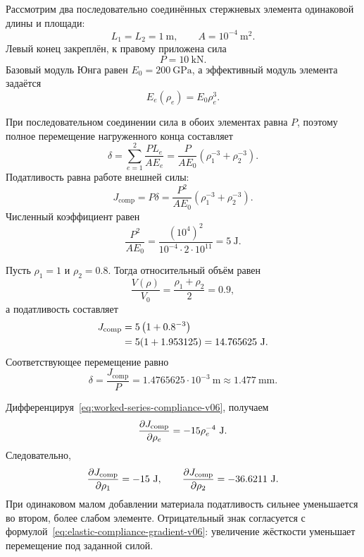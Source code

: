 Рассмотрим два последовательно соединённых стержневых элемента одинаковой длины и площади:
\[
 L_1=L_2=1\ \mathrm{m},
 \qquad
 A=10^{-4}\ \mathrm{m}^2.
\]
Левый конец закреплён, к правому приложена сила
\[
 P=10\ \mathrm{kN}.
\]
Базовый модуль Юнга равен $E_0=200\ \mathrm{GPa}$, а эффективный модуль элемента задаётся
\begin{equation}
\label{eq:worked-density-modulus-v06}
 E_e(\rho_e)=E_0\rho_e^3.
\end{equation}

При последовательном соединении сила в обоих элементах равна $P$, поэтому полное перемещение нагруженного конца составляет
\begin{equation}
\label{eq:worked-series-displacement-v06}
 \delta
 =\sum_{e=1}^2\frac{PL_e}{AE_e}
 =\frac{P}{AE_0}
 \left(\rho_1^{-3}+\rho_2^{-3}\right).
\end{equation}
Податливость равна работе внешней силы:
\begin{equation}
\label{eq:worked-series-compliance-v06}
 J_{\mathrm{comp}}
 =P\delta
 =\frac{P^2}{AE_0}
 \left(\rho_1^{-3}+\rho_2^{-3}\right).
\end{equation}
Численный коэффициент равен
\[
 \frac{P^2}{AE_0}
 =\frac{(10^4)^2}{10^{-4}\cdot2\cdot10^{11}}
 =5\ \mathrm{J}.
\]

Пусть $\rho_1=1$ и $\rho_2=0.8$. Тогда относительный объём равен
\begin{equation}
\label{eq:worked-relative-volume-v06}
 \frac{V(\rho)}{V_0}
 =\frac{\rho_1+\rho_2}{2}
 =0.9,
\end{equation}
а податливость составляет
\begin{align}
 J_{\mathrm{comp}}
 &=5\left(1+0.8^{-3}\right)
 \notag\\
 &=5(1+1.953125)
 =14.765625\ \mathrm{J}.
\label{eq:worked-compliance-value-v06}
\end{align}
Соответствующее перемещение равно
\begin{equation}
\label{eq:worked-end-displacement-v06}
 \delta=\frac{J_{\mathrm{comp}}}{P}
 =1.4765625\cdot10^{-3}\ \mathrm{m}
 \approx1.477\ \mathrm{mm}.
\end{equation}

Дифференцируя~\eqref{eq:worked-series-compliance-v06}, получаем
\begin{equation}
\label{eq:worked-compliance-derivative-v06}
 \frac{\partial J_{\mathrm{comp}}}{\partial \rho_e}
 =-15\rho_e^{-4}\ \mathrm{J}.
\end{equation}
Следовательно,
\begin{equation}
\label{eq:worked-compliance-gradient-values-v06}
 \frac{\partial J_{\mathrm{comp}}}{\partial \rho_1}
 =-15\ \mathrm{J},
 \qquad
 \frac{\partial J_{\mathrm{comp}}}{\partial \rho_2}
 =-36.6211\ \mathrm{J}.
\end{equation}
При одинаковом малом добавлении материала податливость сильнее уменьшается во втором, более слабом элементе. Отрицательный знак согласуется с формулой~\eqref{eq:elastic-compliance-gradient-v06}: увеличение жёсткости уменьшает перемещение под заданной силой.

